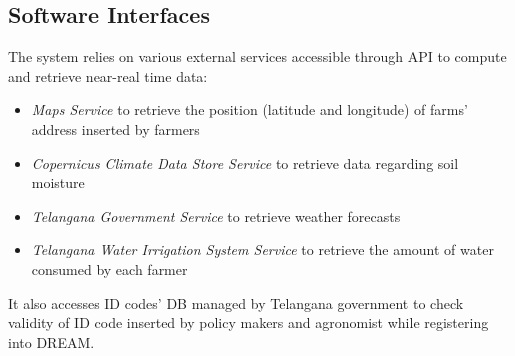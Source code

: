\subsection{Software Interfaces}

The system relies on various external services accessible through API to compute and retrieve near-real time data:
\begin{itemize}
    \item \textit{Maps Service} to retrieve the position (latitude and longitude) of farms' address inserted by farmers
    \item \textit{Copernicus Climate Data Store Service} to retrieve data regarding soil moisture
    \item \textit{Telangana Government Service} to retrieve weather forecasts
    \item \textit{Telangana Water Irrigation System Service} to retrieve the amount of water consumed by each farmer
\end{itemize}
It also accesses ID codes’ DB managed by Telangana government to check validity of ID code inserted by policy makers and agronomist while registering into DREAM.


